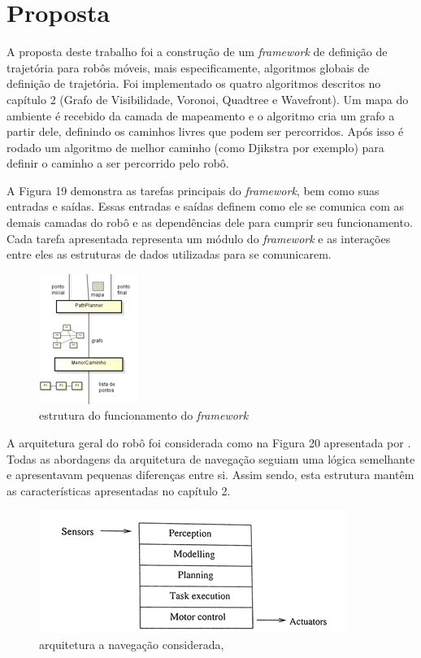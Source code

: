 \chapter[Proposta]{Proposta}

A proposta deste trabalho foi a construção de um \textit{framework} de definição de trajetória para robôs móveis, mais especificamente, algoritmos globais de definição de trajetória. Foi implementado os quatro algoritmos descritos no capítulo 2 (Grafo de Visibilidade, Voronoi, Quadtree e Wavefront). Um mapa do ambiente é recebido da camada de mapeamento e o algoritmo cria um grafo a partir dele, definindo os caminhos livres que podem ser percorridos. Após isso é rodado um algoritmo de melhor caminho (como Djikstra por exemplo) para definir o caminho a ser percorrido pelo robô. 

A Figura 19 demonstra as tarefas principais do \textit{framework}, bem como suas entradas e saídas. Essas entradas e saídas definem como ele se comunica com as demais camadas do robô e as dependências dele para cumprir seu funcionamento. Cada tarefa apresentada representa um módulo do \textit{framework} e as interações entre eles as estruturas de dados utilizadas para se comunicarem.
 
\begin{figure}[h]
	\centering
	\label{fig19}
		\includegraphics[keepaspectratio=true,scale=1]{figuras/framework.png}
	\caption{estrutura do funcionamento do \textit{framework}}
\end{figure} 

A arquitetura geral do robô foi considerada como na Figura 20 apresentada por \cite{Nehmzow2003}. Todas as abordagens da arquitetura de navegação seguiam uma lógica semelhante e apresentavam pequenas diferenças entre si. Assim sendo, esta estrutura mantêm as características apresentadas no capítulo 2.

\begin{figure}[h]
	\centering
	\label{fig20}
		\includegraphics[keepaspectratio=true,scale=1]{figuras/arqusada.jpg}
	\caption{arquitetura a navegação considerada, \cite{Nehmzow2003}}
\end{figure}

